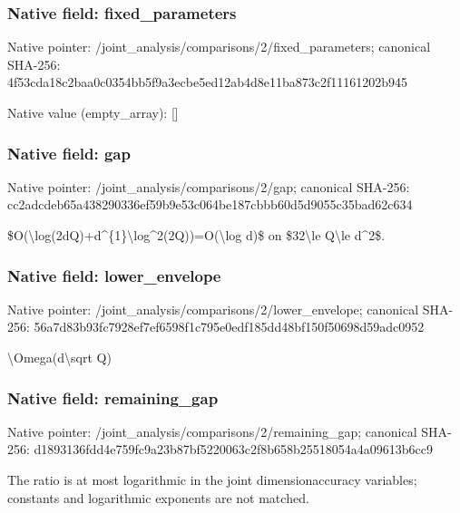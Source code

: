 \documentclass[10pt,a4paper]{article}
\begin{document}
\subsubsection{Native field: fixed\_parameters}


Native pointer: /joint\_analysis/comparis\allowbreak{}ons/2/fixed\_parameters; canonical SHA-256: 4f53cda18c2baa0c0354bb5f\allowbreak{}9a3ecbe5ed12ab4d8e11ba87\allowbreak{}3c2f11161202b945



Native value (empty\_array): []



\subsubsection{Native field: gap}


Native pointer: /joint\_analysis/comparisons/2/gap; canonical SHA-256: cc2adcdeb65a438290336ef5\allowbreak{}9b9e53c064be187cbbb60d5d\allowbreak{}9055c35bad62c634


\$O(\textbackslash{}log(2dQ)+d\textasciicircum{}\{1\}\textbackslash{}log\textasciicircum{}2(2Q))=O(\textbackslash{}log d)\$ on \$32\textbackslash{}le Q\textbackslash{}le d\textasciicircum{}2\$.


\subsubsection{Native field: lower\_envelope}


Native pointer: /joint\_analysis/comparis\allowbreak{}ons/2/lower\_envelope; canonical SHA-256: 56a7d83b93fc7928ef7ef659\allowbreak{}8f1c795e0edf185dd48bf150\allowbreak{}f50698d59adc0952


\textbackslash{}Omega(d\textbackslash{}sqrt Q)


\subsubsection{Native field: remaining\_gap}


Native pointer: /joint\_analysis/comparis\allowbreak{}ons/2/remaining\_gap; canonical SHA-256: d1893136fdd4e759fc9a23b8\allowbreak{}7bf5220063c2f8b658b25518\allowbreak{}054a4a09613b6cc9


The ratio is at most logarithmic in the joint dimensionaccuracy variables; constants and logarithmic exponents are not matched.
\end{document}
